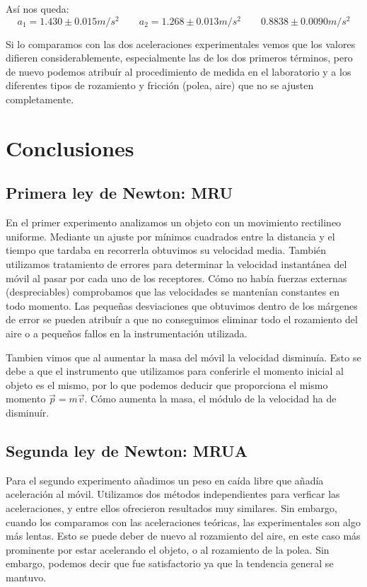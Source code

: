 \documentclass[12pt, a4paper, titlepage]{article}
\begin{document}
  Así nos queda:
  \begin{equation*}
    a_1 = 1.430 \pm 0.015 m/s^2 \qquad a_2 = 1.268 \pm 0.013 m/s^2 \qquad 0.8838 \pm 0.0090 m/s^2
  \end{equation*}

  Si lo comparamos con las dos aceleraciones experimentales vemos que los valores difieren considerablemente, especialmente las de los dos primeros términos, pero de nuevo podemos atribuír al procedimiento de medida en el laboratorio y a los diferentes tipos de rozamiento y fricción (polea, aire) que no se ajusten completamente.


  \newpage
  \section{Conclusiones}

  \subsection{Primera ley de Newton: MRU}

  En el primer experimento analizamos un objeto con un movimiento rectilineo uniforme. Mediante un ajuste por mínimos cuadrados entre la distancia y el tiempo que tardaba en recorrerla obtuvimos su velocidad media. También utilizamos tratamiento de errores para determinar la velocidad instantánea del móvil al pasar por cada uno de los receptores. Cómo no había fuerzas externas (despreciables) comprobamos que las velocidades se mantenían constantes en todo momento. Las pequeñas desviaciones que obtuvimos dentro de los márgenes de error se pueden atribuír a que no conseguimos eliminar todo el rozamiento del aire o a pequeños fallos en la instrumentación utilizada.

  Tambien vimos que al aumentar la masa del móvil la velocidad disminuía. Esto se debe a que el instrumento que utilizamos para conferirle el momento inicial al objeto es el mismo, por lo que podemos deducir que proporciona el mismo momento $\vec{p} = m \vec{v}$. Cómo aumenta la masa, el módulo de la velocidad ha de disminuír.

  \subsection{Segunda ley de Newton: MRUA}

  Para el segundo experimento añadimos un peso en caída libre que añadía aceleración al móvil. Utilizamos dos métodos independientes para verficar las aceleraciones, y entre ellos ofrecieron resultados muy similares. Sin embargo, cuando los comparamos con las aceleraciones teóricas, las experimentales son algo más lentas. Esto se puede deber de nuevo al rozamiento del aire, en este caso más prominente por estar acelerando el objeto, o al rozamiento de la polea. Sin embargo, podemos decir que fue satisfactorio ya que la tendencia general se mantuvo.
\end{document}
